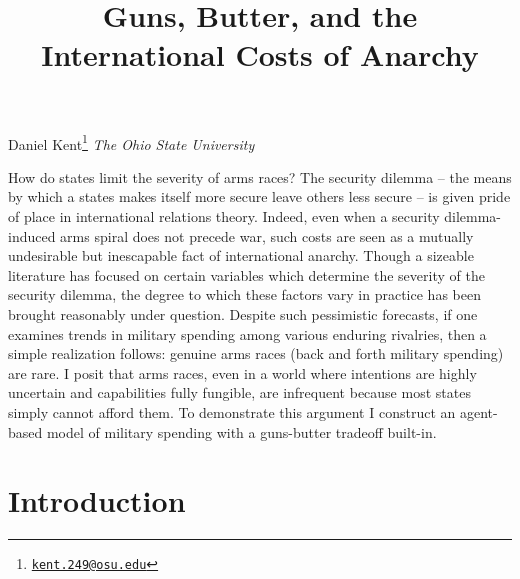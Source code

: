 \documentclass[12pt]{article}
\title{Guns, Butter, and the International Costs of Anarchy} %
\date{}
\renewenvironment{abstract}
{{%
\setlength{\leftmargin}{0mm}
    \setlength{\rightmargin}{\leftmargin}%
}%
\relax}
{\endlist}
\begin{document}

{%
\setlength{\parindent}{0pt}
\thispagestyle{plain}
{\fontsize{20}{22}\selectfont\raggedright
\maketitle  %

}

{
\vskip 13.5pt\relax \normalsize
Daniel Kent\footnote{\href{mailto:kent.249@osu.edu}{\nolinkurl{kent.249@osu.edu}}}
\hskip 15pt \emph{\small \textit{The Ohio State University}}
}

}


\begin{abstract}

    \hbox{\vrule height .2pt width 39.14pc}

    \vskip 8.5pt %

\noindent How do states limit the severity of arms races? The security dilemma -- the means by which a states makes itself more secure leave others less secure -- is given pride of place in international relations theory. Indeed, even when a security dilemma-induced arms spiral does not precede war, such costs are seen as a mutually undesirable but inescapable fact of international anarchy. Though a sizeable literature has focused on certain variables which determine the severity of the security dilemma, the degree to which these factors vary in practice has been brought reasonably under question. Despite such pessimistic forecasts, if one examines trends in military spending among various enduring rivalries, then a simple realization follows: genuine arms races (back and forth military spending) are rare. I posit that arms races, even in a world where intentions are highly uncertain and capabilities fully fungible, are infrequent because most states simply cannot afford them. To demonstrate this argument I construct an agent-based model of military spending with a guns-butter tradeoff built-in.


\hbox{\vrule height .2pt width 39.14pc}

\end{abstract}


\vskip 6.5pt

\doublespacing

\section{Introduction}\label{introduction}
\end{document}
